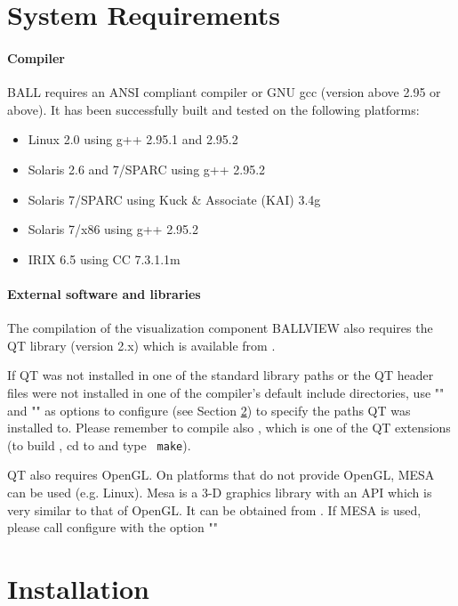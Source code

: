 \section{System Requirements}

\paragraph{Compiler}
  BALL requires an ANSI compliant \CPP compiler or GNU gcc
  (version above 2.95 or above).
  It has been successfully built and tested on the following platforms:
	\begin{itemize}	
    \item Linux 2.0 using g++ 2.95.1 and 2.95.2
    \item Solaris 2.6 and 7/SPARC using g++ 2.95.2
    \item Solaris 7/SPARC using Kuck \& Associate (KAI) \CPP 3.4g
    \item Solaris 7/x86 using g++ 2.95.2
    \item IRIX 6.5 using CC 7.3.1.1m 
	\end{itemize}

\paragraph{External software and libraries}
The compilation of the visualization component BALLVIEW also requires
the QT library (version 2.x) which is available from
.

If QT was not installed in one of the standard library paths or the
QT header files were not installed in one of the compiler's default
include directories, use "" and
"" as
options to configure (see Section \ref{section:building-ball}) to specify the paths
QT was installed to.
Please remember to compile also , which is one of the QT extensions
(to build , cd to {\tt{}} and type {\tt
make}).

QT also requires OpenGL. On platforms that do not provide OpenGL, MESA can
be used (e.g. Linux). Mesa is a 3-D graphics library with an API which is 
very similar to that of OpenGL. It can be obtained from .
If MESA is used, please call configure with the option ""

\section{Installation}
\label{section:building-ball}

